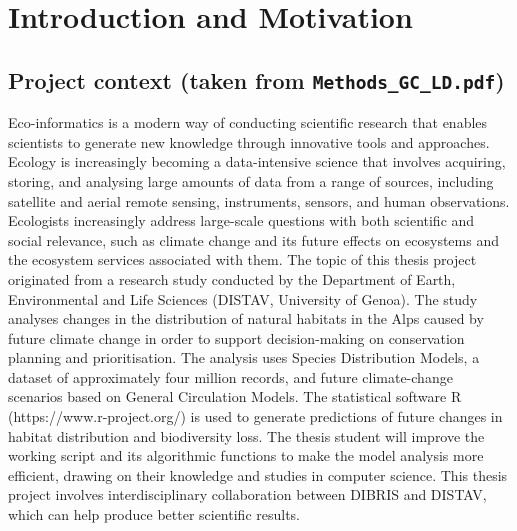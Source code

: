 \chapter{Introduction and Motivation}


\section{Project context (taken from \texttt{Methods\_GC\_LD.pdf})}

Eco-informatics is a modern way of conducting scientific research that enables scientists to generate
new knowledge through innovative tools and approaches. Ecology is increasingly becoming a data-intensive
science that involves acquiring, storing, and analysing large amounts of data from a range of sources,
including satellite and aerial remote sensing, instruments, sensors, and human observations. Ecologists
increasingly address large-scale questions with both scientific and social relevance, such as climate change
and its future effects on ecosystems and the ecosystem services associated with them. The topic of this
thesis project originated from a research study conducted by the Department of Earth, Environmental and Life
Sciences (DISTAV, University of Genoa). The study analyses changes in the distribution of natural habitats
in the Alps caused by future climate change in order to support decision-making on conservation planning and
prioritisation. The analysis uses Species Distribution Models, a dataset of approximately four million
records, and future climate-change scenarios based on General Circulation Models. The statistical software
R (https://www.r-project.org/) is used to generate predictions of future changes in habitat distribution and
biodiversity loss. The thesis student will improve the working script and its algorithmic functions to make
the model analysis more efficient, drawing on their knowledge and studies in computer science. This thesis
project involves interdisciplinary collaboration between DIBRIS and DISTAV, which can help produce better
scientific results.



